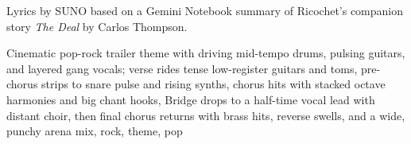 
\begin{notes}
Lyrics by SUNO based on a Gemini Notebook summary of Ricochet's companion story \emph{The Deal} by Carlos Thompson.
\end{notes}
\begin{style}
Cinematic pop-rock trailer theme with driving mid-tempo drums, pulsing guitars, and layered gang vocals; verse rides tense low-register guitars and toms, pre-chorus strips to snare pulse and rising synths, chorus hits with stacked octave harmonies and big chant hooks, Bridge drops to a half-time vocal lead with distant choir, then final chorus returns with brass hits, reverse swells, and a wide, punchy arena mix, rock, theme, pop
\end{style}
